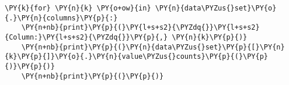    
    \begin{tcolorbox}[breakable, size=fbox, boxrule=1pt, pad at break*=1mm,colback=cellbackground, colframe=cellborder]
\begin{Verbatim}[commandchars=\\\{\}]
\PY{k}{for} \PY{n}{k} \PY{o+ow}{in} \PY{n}{data\PYZus{}set}\PY{o}{.}\PY{n}{columns}\PY{p}{:}
    \PY{n+nb}{print}\PY{p}{(}\PY{l+s+s2}{\PYZdq{}}\PY{l+s+s2}{Column:}\PY{l+s+s2}{\PYZdq{}}\PY{p}{,} \PY{n}{k}\PY{p}{)}
    \PY{n+nb}{print}\PY{p}{(}\PY{n}{data\PYZus{}set}\PY{p}{[}\PY{n}{k}\PY{p}{]}\PY{o}{.}\PY{n}{value\PYZus{}counts}\PY{p}{(}\PY{p}{)}\PY{p}{)}
    \PY{n+nb}{print}\PY{p}{(}\PY{p}{)}
\end{Verbatim}
\end{tcolorbox}

